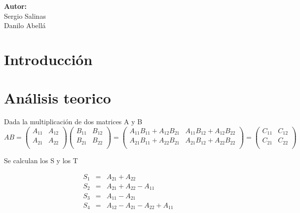 \documentclass[12pt,letterpaper]{scrartcl}
\begin{document}
\begin{titlepage}
\begin{center}
\begin{minipage}[l]{0.4\textwidth}
	\begin{flushright}

		\textbf{\textsf{Autor:}}\\
		\linespread{1}
		\large Sergio Salinas\\
		\large Danilo Abellá\\

	\end{flushright}
\end{minipage}

\end{center}

\end{titlepage}



\newpage

\tableofcontents

\newpage
\section{Introducción}

\section{Análisis teorico}

Dada la multiplicación de dos matrices  A y B
$$
AB =
\begin{pmatrix}
A_{11} & A_{12} \\
A_{21} & A_{22}\\
\end{pmatrix}
\begin{pmatrix}
B_{11} & B_{12} \\
B_{21} & B_{22}\\
\end{pmatrix}
 = \begin{pmatrix}
A_{11} B_{11} + A_{12} B_{21} & A_{11} B_{12} + A_{12} B_{22}\\
A_{21} B_{11} + A_{22} B_{21} & A_{21} B_{12} + A_{22} B_{22}\\
\end{pmatrix}
=
\begin{pmatrix}
C_{11} & C_{12} \\
C_{21} & C_{22}\\
\end{pmatrix}
$$

Se calculan los S y los T


\[
\begin{array}{lcl}
	S_1 &=& A_{21} + A_{22} \\
	S_2 &=& A_{21} + A_{22} - A_{11} \\
	S_3 &=& A_{11} - A_{21}\\
	S_4 &=& A_{12} -A_{21} - A_{22} + A_{11} \\
\end{array}
\]
\end{document}
